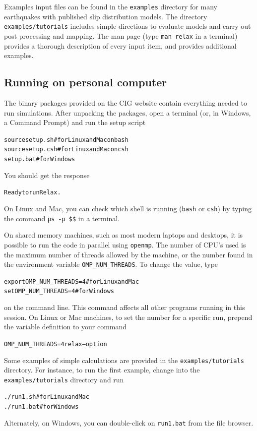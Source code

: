 \documentclass[10pt]{article}
\begin{document}
Examples input files can be found in the \verb'examples' directory for many earthquakes with published slip distribution models. The directory \verb'examples/tutorials' includes simple directions to evaluate models and carry out post processing and mapping. The man page (type \verb'man relax' in a terminal) provides a thorough description of every input item, and provides additional examples.

\subsection{Running on personal computer}


The binary packages provided on the CIG website contain everything needed to run simulations.  After unpacking the packages, open a terminal (or, in Windows, a Command Prompt) and run the setup script
\begin{alltt}
{\color{orange}source setup.sh}  # for Linux and Mac on bash
{\color{orange}source setup.csh} # for Linux and Mac on csh
{\color{orange}setup.bat}        # for Windows
\end{alltt}
You should get the response
\begin{alltt}
{\color{NavyBlue}Ready to run Relax.}
\end{alltt}
On Linux and Mac, you can check which shell is running (\verb`bash` or \verb`csh`) by typing the command \verb`ps -p $$` in a terminal.

On shared memory machines, such as most modern laptops and desktops, it is possible to run the code in parallel using \verb'openmp'. The number of CPU's used is the maximum number of threads allowed by the machine, or the number found in the environment variable \verb'OMP_NUM_THREADS'. To change the value, type
\begin{alltt}
{\color{orange}export OMP_NUM_THREADS=4} # for Linux and Mac
{\color{orange}set OMP_NUM_THREADS=4}    # for Windows
\end{alltt}
on the command line. This command affects all other programs running
in this session. On Linux or Mac machines, to set the number for a
specific run, prepend the variable definition to your command
\begin{alltt}
{\color{orange}OMP_NUM_THREADS=4 relax --option}
\end{alltt}

Some examples of simple calculations are provided in the \verb'examples/tutorials' directory. For instance, to run the first example, change into the \verb'examples/tutorials' directory and run
\begin{alltt}
{\color{orange}./run1.sh}  # for Linux and Mac
{\color{orange}./run1.bat} # for Windows
\end{alltt}
Alternately, on Windows, you can double-click on \verb'run1.bat' from the file browser.
\end{document}
